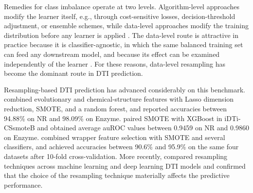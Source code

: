 \documentclass[pdflatex,sn-basic]{sn-jnl}
\begin{document}
Remedies for class imbalance operate at two levels. Algorithm-level
approaches modify the learner itself, e.g., through cost-sensitive
losses, decision-threshold adjustment, or ensemble schemes, while
data-level approaches modify the training distribution before any
learner is applied \citep{mohammed2020machine, devi2020review}. The
data-level route is attractive in practice because it is
classifier-agnostic, in which the same balanced training set can feed
any downstream model, and because its effect can be examined
independently of the learner \citep{kim2022empirical}. For these
reasons, data-level resampling has become the dominant route in DTI
prediction.

Resampling-based DTI prediction has advanced considerably on this
benchmark. \citet{shi2019predicting} combined evolutionary and
chemical-structure features with Lasso dimension reduction, SMOTE, and a
random forest, and reported accuracies between 94.88\% on NR and
98.09\% on Enzyme. \citet{mahmud2019idti} paired SMOTE with XGBoost in
iDTi-CSsmoteB and obtained average auROC values between 0.9459 on NR and
0.9860 on Enzyme. \citet{redkar2020machine} combined wrapper feature
selection with SMOTE and several classifiers, and achieved accuracies
between 90.6\% and 95.9\% on the same four datasets after 10-fold
cross-validation. More recently, \citet{azlimkhan2023comparative}
compared resampling techniques across machine learning and deep learning
DTI models and confirmed that the choice of the resampling technique
materially affects the predictive performance.
\end{document}
